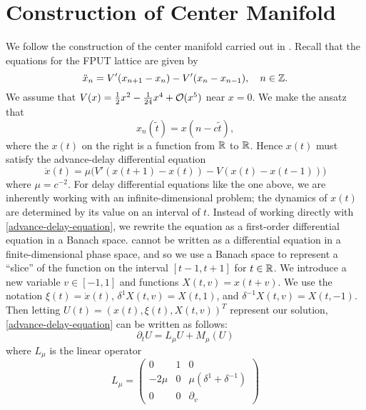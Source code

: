\section{Construction of Center Manifold}
We follow the construction of the center manifold carried out in \cite{iooss2000travelling}. Recall that the equations for the FPUT lattice are given by
\begin{equation}\label{fput-lattice-odes}
	\ddot x_n = V'(x_{n+1} - x_n) - V'(x_n - x_{n-1}), \quad n\in\mathbb{Z}.
\end{equation}
We assume that \(V(x) = \frac 12 x^2 - \frac 1 {24} x^4 + \mathcal{O}(x^5)\) near \(x=0\). We make the ansatz that 
\begin{equation}
	x_n(\tilde t) = x(n-c\tilde t),
\end{equation}
where the \(x(t)\) on the right is a function from \(\mathbb{R}\) to \(\mathbb{R}\). Hence \(x(t)\) must satisfy the advance-delay differential equation
\begin{equation}\label{advance-delay-equation}
	\ddot x (t) = \mu \Big(V'(x(t+1) - x(t)) - V(x(t) - x(t-1)) \Big)
\end{equation}
where \(\mu = c^{-2}\). For delay differential equations like the one above, we are inherently working with an infinite-dimensional problem; the dynamics of \(x(t)\) are determined by its value on an interval of \(t\). Instead of working directly with \cref{advance-delay-equation}, we rewrite the equation as a first-order differential equation in a Banach space.  cannot be written as a differential equation in a finite-dimensional phase space, and so we use a Banach space to represent a ``slice'' of the function on the interval \([t-1,t+1]\) for \(t\in\mathbb{R}\). We introduce a new variable \(v\in[-1,1]\) and functions \(X(t,v) = x(t+v)\). We use the notation \(\xi(t) = \dot x(t)\), \(\delta^1X(t,v) = X(t,1)\), and \(\delta^{-1} X(t,v) = X(t,-1)\). Then letting \(U(t) = (x(t), \xi(t), X(t,v))^T\) represent our solution, \cref{advance-delay-equation} can be written as follows:
\begin{equation}\label{first-order-abstract-ode}
	\partial_t U = L_\mu U + M_\mu (U)
\end{equation}
where \(L_\mu\) is the linear operator
\begin{equation}
	L_\mu = \begin{pmatrix}
		0 & 1 & 0\\
		-2\mu & 0 & \mu(\delta^1 + \delta^{-1}) \\
		0 & 0 & \partial_v
	\end{pmatrix}
\end{equation}
